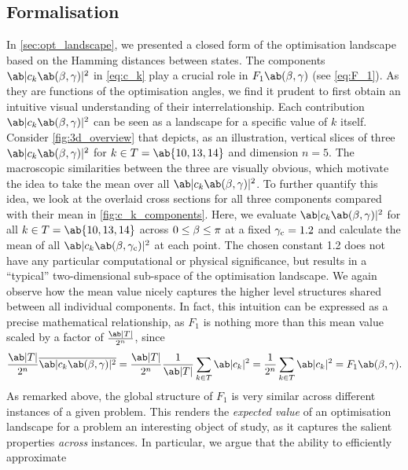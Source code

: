 \subsection{Formalisation}
In \cref{sec:opt_landscape}, we presented a closed form of the optimisation landscape based on the Hamming distances between states. 
The components $\ab|c_k\ab(\mangle,\pangle)|^2$ in \cref{eq:c_k} play a crucial role
in $F_1\ab(\mangle, \pangle)$ (see \cref{eq:F_1}). As they are functions of the optimisation angles, we find it prudent to first obtain an intuitive visual understanding of their 
interrelationship. Each contribution $\ab|c_k\ab(\mangle,\pangle)|^2$ can be seen as a landscape for a specific value of \(k\) itself. Consider \cref{fig:3d_overview} that depicts, as an illustration, vertical slices of three $\ab|c_k\ab(\mangle,\pangle)|^2$ for $k \in T = \ab\{10, 13, 14\}$ and dimension $n = 5$. The macroscopic similarities between the three are visually obvious, which motivate the idea to take the mean over all $\ab|c_k\ab(\mangle,\pangle)|^2$. To further quantify this idea, we look at the overlaid cross sections for all three components compared with their mean in \cref{fig:c_k_components}. Here, we evaluate $\ab|c_k\ab(\mangle,\pangle)|^2$ for all $k \in T = \ab\{10, 13, 14\}$ across $0 \leq \beta \leq \pi$ at a fixed $\gamma_{\text{c}} = 1.2$ and calculate the mean of all $\ab|c_k\ab(\mangle,\pangle_{\text{c}})|^2$ at each point. The chosen constant 1.2 does not have any particular computational or physical significance, but results in a \enquote{typical} two-dimensional sub-space of the optimisation landscape. We again observe how the mean value nicely captures the higher level structures shared between all individual components. In fact, this intuition can be expressed as a precise mathematical relationship, as $F_1$ is nothing more than this mean value scaled by a factor of $\frac{\ab|T|}{2^n}$, since
%
\begin{equation}
    \label{eq:F_as_average}
    \frac{\ab|T|}{2^n} \overline{\ab|c_k\ab(\mangle,\pangle)|^2} = \frac{\ab|T|}{2^n} \frac{1}{\ab|T|} \sum_{k \in T} \ab|c_k|^2 =  \frac{1}{2^n} \sum_{k \in T} \ab|c_k|^2 = F_1\ab(\mangle,\pangle).
\end{equation}
%
As remarked above, the global structure of $F_1$ is very similar across different instances of a given problem. This renders the \emph{expected value} of an optimisation landscape for a problem an interesting object of study, as it captures the salient properties \emph{across} instances. In particular, we argue 
that the ability to efficiently approximate 


